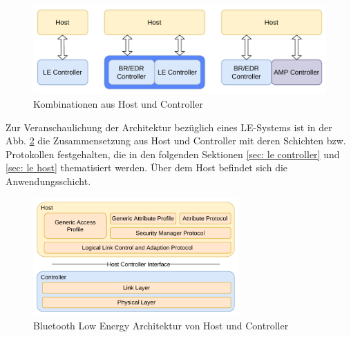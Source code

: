 \begin{figure}
    \centering
    \includegraphics[width=0.9\linewidth]{graphics/kombination_host_controller.pdf}
    \caption{Kombinationen aus Host und Controller \cite{BtSpec4.0_fig_124}}
    \label{fig: kombinationen aus host und controller}
\end{figure}

Zur Veranschaulichung der Architektur bezüglich eines LE-Systems ist in der Abb. \ref{fig: host controller architektur} die Zusammensetzung aus Host und Controller mit deren Schichten bzw. Protokollen festgehalten, die in den folgenden Sektionen \ref{sec: le controller} und \ref{sec: le host} thematisiert werden. Über dem Host befindet sich die Anwendungsschicht.

\begin{figure}
    \centering
    \includegraphics[width=0.7\textwidth]{graphics/host_controller_hci.pdf}
    \caption[Bluetooth Low Energy Architektur von Host und Controller]{Bluetooth Low Energy Architektur von Host und Controller \cite{BtSpec4.0_fig_137}}
    \label{fig: host controller architektur}
\end{figure}